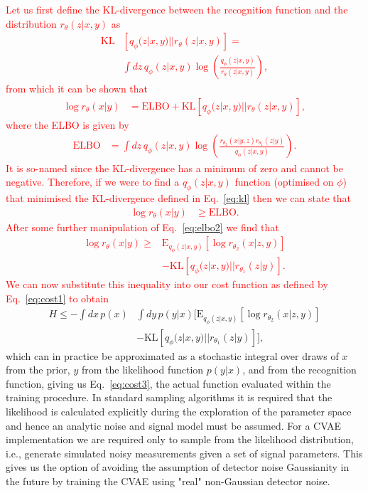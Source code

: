 \documentclass[%
showpacs,
nofootinbib,
 amsmath,amssymb,
 aps,
 twocolumn,
 prl,
 reprint,
floatfix,
]{revtex4-1}
\newcommand{\new}[1]{\textcolor{red}{#1}}
\begin{document}
%
%
\new{Let us first define the \ac{KL}-divergence between the recognition function and
the distribution $r_{\theta}(z|x,y)$ as 
%
\begin{align}\label{eq:kl}
\text{KL}&\left[q_{\phi}(z|x,y)||r_{\theta}(z|x,y)\right] = \\
&\int dz\,q_{\phi}(z|x,y)
\log\left(\frac{q_{\phi}(z|x,y)}{r_{\theta}(z|x,y)}\right),\nonumber
\end{align}
%   
from which it can be shown that
%
\begin{align}\label{eq:elbo1}
\log r_{\theta}(x|y) &= \text{ELBO} + \text{KL}\left[q_{\phi}(z|x,y)||r_{\theta}(z|x,y)\right],
\end{align}
%
where the \ac{ELBO} is given by
%
\begin{align}\label{eq:elbo2}
\text{ELBO} &= \int dz\,
q_{\phi}(z|x,y)\log\left(\frac{r_{\theta_{2}}(x|y,z)r_{\theta_{1}}(z|y)}{q_{\phi}(z|x,y)}\right).
\end{align}
%
It is so-named since the \ac{KL}-divergence has a minimum of zero and cannot
be negative. Therefore, if we were to find a $q_{\phi}(z|x,y)$ function (optimised on
$\phi$) that minimised the \ac{KL}-divergence defined in Eq.~\ref{eq:kl} then we can state that
%
\begin{align}
\log r_{\theta}(x|y) &\geq \text{ELBO}.
\end{align}
%
After some further manipulation of Eq.~\ref{eq:elbo2} we find that
%
\begin{align}\label{eq:logr}
\log r_{\theta}(x|y) \geq  &\text{E}_{q_{\phi}(z|x,y)}\left[\log
r_{\theta_{2}}(x|z,y)\right] \nonumber\\
&-\text{KL}\left[q_{\phi}(z|x,y)||r_{\theta_{1}}(z|y)\right].
\end{align}
%
We can now substitute this inequality into our cost function as defined by
Eq.~\ref{eq:cost1} to obtain}
%
\begin{align}\label{eq:cost2}
H \leq  -\int dx\, p(x)&\int dy \,p(y|x)
\Big[\text{E}_{q_{\phi}(z|x,y)}\left[\log r_{\theta_{2}}(x|z,y)\right]
\nonumber\\
&-\text{KL}\left[q_{\phi}(z|x,y)||r_{\theta_{1}}(z|y)\right]\Big],  
\end{align}
%
which can in practice be approximated as a stochastic integral over draws of
$x$ from the prior, $y$ from the likelihood function $p(y|x)$, and from the
recognition function, giving us Eq.~\ref{eq:cost3}, the actual function
evaluated within the training procedure. In standard sampling algorithms it is
required that the likelihood is calculated explicitly during the exploration of
the parameter space and hence an analytic noise and signal model must be
assumed. For a \ac{CVAE} implementation we are required only to sample from
the likelihood distribution, i.e., generate simulated noisy measurements given a
set of signal parameters. This gives us the option of avoiding the assumption
of detector noise Gaussianity in the future by training the \ac{CVAE} using "real"
non-Gaussian detector noise.
\end{document}
